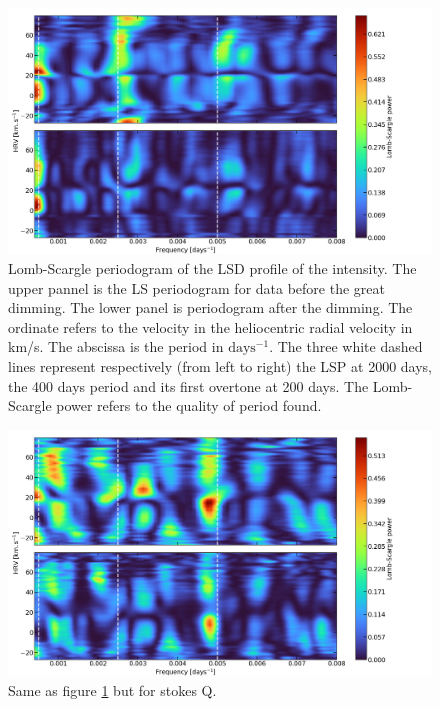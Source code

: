 \documentclass{aa}
\begin{document}
\begin{figure}[!h]
    \centering
    \includegraphics[width=\textwidth]{Lomb-Scargle Intensity.png}
    \caption{Lomb-Scargle periodogram of the LSD profile of the intensity. The upper pannel is the LS periodogram for data before the great dimming. The lower panel is periodogram after the dimming. The ordinate refers to the velocity in the heliocentric radial velocity in km/s. The abscissa is the period in $\mathrm{days^{-1}}$. The three white dashed lines represent respectively (from left to right) the LSP at 2000 days, the 400 days period and its first overtone at 200 days. The Lomb-Scargle power refers to the quality of period found. }
    \label{LS intensity}
\end{figure}

\begin{figure}[!h]
    \centering
    \includegraphics[width=\textwidth]{Lomb-Scargle Stokes Q.png}
    \caption{Same as figure \ref{LS intensity} but for stokes Q. }
    \label{LS Q}
\end{figure}
\end{document}
